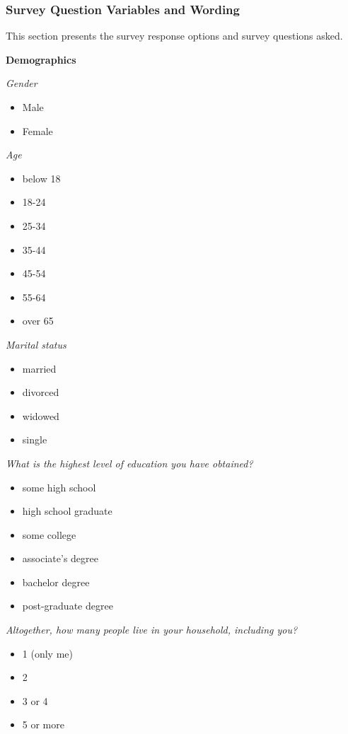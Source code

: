 \documentclass[12pt]{article}
\begin{document}
\clearpage

\subsubsection*{Survey Question Variables and Wording}

This section presents the survey response options and survey questions asked.

\textbf{Demographics}

\emph{Gender}
\begin{itemize}
\item Male
\item Female
\end{itemize}

\emph{Age}
\begin{itemize}
\item below 18
\item 18-24
\item 25-34
\item 35-44
\item 45-54
\item 55-64
\item over 65
\end{itemize}

\emph{Marital status}
\begin{itemize}
\item married
\item divorced
\item widowed
\item single
\end{itemize}


\emph{What is the highest level of education you have obtained?}
\begin{itemize}
\item some high school
\item high school graduate
\item some college
\item associate’s degree
\item bachelor degree
\item post-graduate degree
\end{itemize}

\emph{Altogether, how many people live in your household, including you?}
\begin{itemize}
\item 1 (only me)
\item 2
\item 3 or 4
\item 5 or more
\end{itemize}
\end{document}
